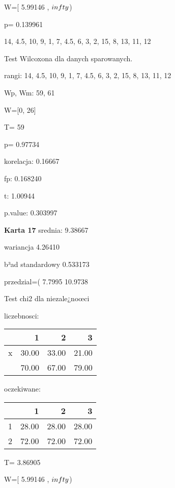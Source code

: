 \documentclass[a4paper,12pt]{article}
\begin{document}
\begin{multicols}{3}
   W=[ 5.99146 , $\\infty$) 
   
   p= 0.139961 \vspace{1cm} 

  14, 4.5, 10, 9, 1, 7, 4.5, 6, 3, 2, 15, 8, 13, 11, 12 

  Test Wilcoxona dla danych sparowanych. 
  
  rangi: 14, 4.5, 10, 9, 1, 7, 4.5, 6, 3, 2, 15, 8, 13, 11, 12 
  
  Wp, Wm:  59,  61 
  
  W=[0, 26]  
  
  T=  59 
  
  p= 0.97734 \vspace{1cm} 

  korelacja: 0.16667
     
     fp: 0.168240
     
     t: 1.00944
     
     p.value: 0.303997 \vspace{1cm} 

  \textbf{Karta  17 } 
 srednia: 9.38667 
     
     wariancja 4.26410  
     
     b³ad standardowy 0.533173 
     
     przedzial=( 7.7995 10.9738 \vspace{1cm} 

  Test chi2 dla niezale¿noœci 
   
   liczebnosci: %
\begin{tabular}{rrrr}
  \hline
 & 1 & 2 & 3 \\
  \hline
x & 30.00 & 33.00 & 21.00 \\
   & 70.00 & 67.00 & 79.00 \\
   \hline
\end{tabular}
 
   
   oczekiwane: %
\begin{tabular}{rrrr}
  \hline
 & 1 & 2 & 3 \\
  \hline
1 & 28.00 & 28.00 & 28.00 \\
  2 & 72.00 & 72.00 & 72.00 \\
   \hline
\end{tabular}
 
   
   T= 3.86905 
   
   W=[ 5.99146 , $\\infty$) 
   

\end{multicols}
\end{document}
